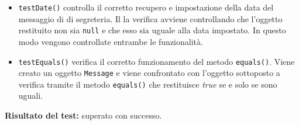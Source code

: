 \begin{itemize}
\begin{itemize}
\item \texttt{testDate()} controlla il corretto recupero e impostazione della data del messaggio di di segreteria.
Il la verifica avviene controllando che l'oggetto restituito non sia \texttt{null} e che esso sia uguale alla data impostato. In questo modo vengono controllate entrambe le funzionalità. 


\item \texttt{testEquals()}
verifica il corretto funzionamento del metodo \texttt{equals()}. Viene creato un oggetto \texttt{Message} e viene confrontato con l'oggetto sottoposto a verifica tramite il metodo \texttt{equals()} che restituisce \textit{true} se e solo se sono uguali.
 
\end{itemize}
\textbf{Risultato del test:} superato con successo.
\end{itemize}

